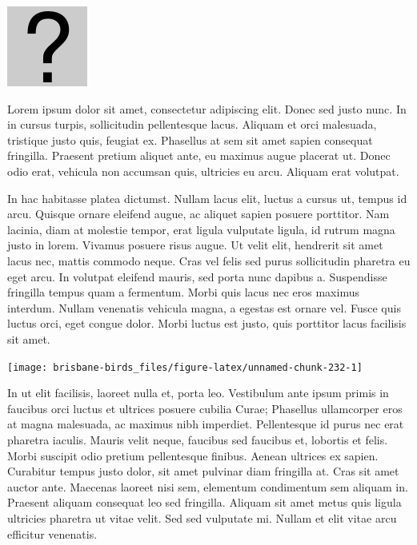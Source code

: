 \documentclass[]{book}
\let\origfigure\figure
\let\endorigfigure\endfigure
\renewenvironment{figure}[1][2] {
  \expandafter\origfigure\expandafter[H]
} {
  \endorigfigure
}
\begin{document}
\begin{figure}
\centering
\includegraphics{assets/missing.png}
\caption{No image for species}
\end{figure}

Lorem ipsum dolor sit amet, consectetur adipiscing elit. Donec sed justo
nunc. In in cursus turpis, sollicitudin pellentesque lacus. Aliquam et
orci malesuada, tristique justo quis, feugiat ex. Phasellus at sem sit
amet sapien consequat fringilla. Praesent pretium aliquet ante, eu
maximus augue placerat ut. Donec odio erat, vehicula non accumsan quis,
ultricies eu arcu. Aliquam erat volutpat.

In hac habitasse platea dictumst. Nullam lacus elit, luctus a cursus ut,
tempus id arcu. Quisque ornare eleifend augue, ac aliquet sapien posuere
porttitor. Nam lacinia, diam at molestie tempor, erat ligula vulputate
ligula, id rutrum magna justo in lorem. Vivamus posuere risus augue. Ut
velit elit, hendrerit sit amet lacus nec, mattis commodo neque. Cras vel
felis sed purus sollicitudin pharetra eu eget arcu. In volutpat eleifend
mauris, sed porta nunc dapibus a. Suspendisse fringilla tempus quam a
fermentum. Morbi quis lacus nec eros maximus interdum. Nullam venenatis
vehicula magna, a egestas est ornare vel. Fusce quis luctus orci, eget
congue dolor. Morbi luctus est justo, quis porttitor lacus facilisis sit
amet.

\begin{figure}
\texttt{[image: brisbane-birds\_files/figure-latex/unnamed-chunk-232-1]} \caption{insert figure caption}\label{fig:unnamed-chunk-232}
\end{figure}

In ut elit facilisis, laoreet nulla et, porta leo. Vestibulum ante ipsum
primis in faucibus orci luctus et ultrices posuere cubilia Curae;
Phasellus ullamcorper eros at magna malesuada, ac maximus nibh
imperdiet. Pellentesque id purus nec erat pharetra iaculis. Mauris velit
neque, faucibus sed faucibus et, lobortis et felis. Morbi suscipit odio
pretium pellentesque finibus. Aenean ultrices ex sapien. Curabitur
tempus justo dolor, sit amet pulvinar diam fringilla at. Cras sit amet
auctor ante. Maecenas laoreet nisi sem, elementum condimentum sem
aliquam in. Praesent aliquam consequat leo sed fringilla. Aliquam sit
amet metus quis ligula ultricies pharetra ut vitae velit. Sed sed
vulputate mi. Nullam et elit vitae arcu efficitur venenatis.
\end{document}
